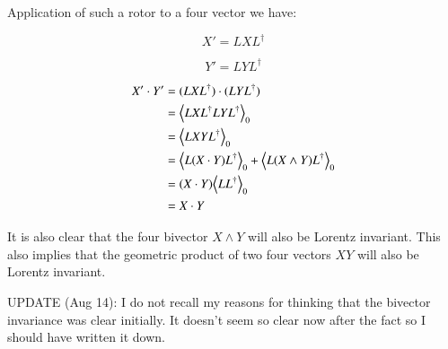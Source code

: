 Application of such a rotor to a four vector we have:

\begin{equation*}
X' = L X L^\dagger
\end{equation*}

\begin{equation*}
Y' = L Y L^\dagger
\end{equation*}

\begin{align*}
X' \cdot Y' &= (L X L^\dagger) \cdot (L Y L^\dagger) \\
&= {\left\langle{{ L X L^\dagger L Y L^\dagger }}\right\rangle}_{0} \\
&= {\left\langle{{ L X Y L^\dagger }}\right\rangle}_{0} \\
&= {\left\langle{{ L (X \cdot Y) L^\dagger }}\right\rangle}_{0} + {\left\langle{{ L (X \wedge Y) L^\dagger }}\right\rangle}_{0} \\
&= (X \cdot Y) {\left\langle{{ L L^\dagger }}\right\rangle}_{0} \\
&= X \cdot Y
\end{align*}

It is also clear that the four bivector $X \wedge Y$ will also be Lorentz invariant.  This also implies that the geometric product of two four vectors $X Y$ will also be Lorentz invariant.

UPDATE (Aug 14): I 
do not 
recall my reasons for thinking that the bivector invariance was clear initially.  It doesn't seem so clear now after the fact so I should have written it down.
